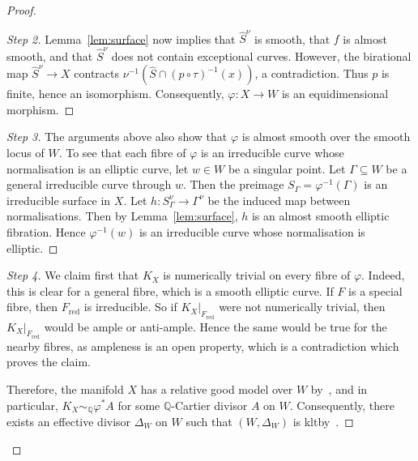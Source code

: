 \documentclass[11pt]{article}
\theoremstyle{definition}
\newenvironment{proofc}{\begin{proof}}{\end{proof}}
\numberwithin{equation}{section}
\numberwithin{figure}{section}
\numberwithin{table}{section}
\DeclareMathOperator{\red}{red}
\newcommand{\Qbb}{\mathbb{Q}} %
\newenvironment{step}[1]{\begin{proof}[#1]}{\let\qed\relax\end{proof}}
\newenvironment{laststep}[1]{\begin{proof}[#1]}{\end{proof}}
\begin{document}
\begin{proofc}
\begin{step}{Step 2}
Lemma~\ref{lem:surface} now implies that $\widehat S^\nu$ is smooth, that $f$ is almost smooth, and that $\widehat S^\nu$ does not contain exceptional curves. However, the birational map $\widehat S^\nu \to X$ contracts $\nu^{-1}(\widehat S\cap (p\circ\tau)^{-1}(x))$, a contradiction. Thus $p$ is finite, hence an isomorphism. Consequently, $\varphi\colon X \to W$ is an equidimensional morphism.
\end{step}

\begin{step}{Step 3}
The arguments above also show that $\varphi$ is almost smooth over the smooth locus of $W$. To see that each fibre of $\varphi$ is an irreducible curve whose normalisation is an elliptic curve, let $w \in W$ be a singular point. Let $\Gamma \subseteq W$ be a general irreducible curve through $w$. Then the preimage $S_\Gamma = \varphi^{-1}(\Gamma)$ is an irreducible surface in $X$. Let $h\colon S_\Gamma^\nu \to \Gamma^\nu$ be the induced map between normalisations. Then by Lemma~\ref{lem:surface}, $h$ is an almost smooth elliptic fibration. Hence $\varphi^{-1}(w)$ is an irreducible curve whose normalisation is elliptic.
\end{step}

\begin{laststep}{Step 4}
We claim first that $K_X$ is numerically trivial on every fibre of $\varphi$. Indeed, this is clear for a general fibre, which is a smooth elliptic curve. If $F$ is a special fibre, then $F_{\red}$ is irreducible. So if $K_X|_{F_{\red}}$ were not numerically trivial, then $K_X|_{F_{\red}}$ would be ample or anti-ample. Hence the same would be true for the nearby fibres, as ampleness is an open property, which is a contradiction which proves the claim.

Therefore, the manifold $X$ has a relative good model over $W$ by~\cite[Theorem~2.12]{HX13}, and in particular, $K_X\sim_\Qbb\varphi^*A$ for some $\Qbb$-Cartier divisor $A$ on $W$. Consequently, there exists an effective divisor $\Delta_W$ on $W$ such that $(W,\Delta_W)$ is klt\linebreak by~\cite[Theorem~0.2]{Amb05a}.
\end{laststep}
\let\qed\relax
\end{proofc}
\end{document}
